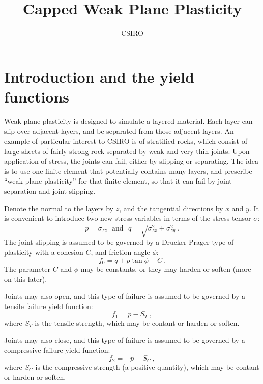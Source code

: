 \documentclass[]{scrreprt}
\begin{document}
\title{Capped Weak Plane Plasticity}
\author{CSIRO}
\maketitle

\tableofcontents


\chapter{Introduction and the yield functions}

Weak-plane plasticity is designed to simulate a layered material.
Each layer can slip over adjacent layers, and be separated from those
adjacent layers.  An example of particular interest to CSIRO is of
stratified rocks, which consist of large sheets of fairly strong rock
separated by weak and very thin joints.  Upon application of stress,
the joints can fail, either by slipping or separating.  The idea is to
use one finite element that potentially contains many layers, and
prescribe ``weak plane plasticity'' for that finite element, so that
it can fail by joint separation and joint slipping.

Denote the normal to the layers by $z$, and the tangential directions
by $x$ and $y$.  It is convenient to introduce two new stress variables in
terms of the stress tensor $\sigma$:
\begin{equation}
p = \sigma_{zz} \ \ \ \mbox{and}\ \ \ q = \sqrt{\sigma_{zx}^{2} +
  \sigma_{zy}^{2}} \ .
\end{equation}
The joint slipping is assumed to be governed by a
Drucker-Prager type of plasticity with a cohesion $C$, and friction
angle $\phi$:
\begin{equation}
f_{0} = q + p\tan\phi - C \ .
\end{equation}
The parameter $C$ and $\phi$ may be constants, or they may harden or
soften (more on this later).

Joints may also open, and this type of failure is assumed to be
governed by a tensile failure yield function:
\begin{equation}
f_{1} = p - S_{T} \ ,
\end{equation}
where $S_{T}$ is the tensile strength, which may be contant or harden
or soften.

Joints may also close, and this type of failure is assumed to be
governed by a compressive failure yield function:
\begin{equation}
f_{2} = - p - S_{C} \ ,
\end{equation}
where $S_{C}$ is the compressive strength (a positive quantity), which
may be contant or harden or soften.
\end{document}
